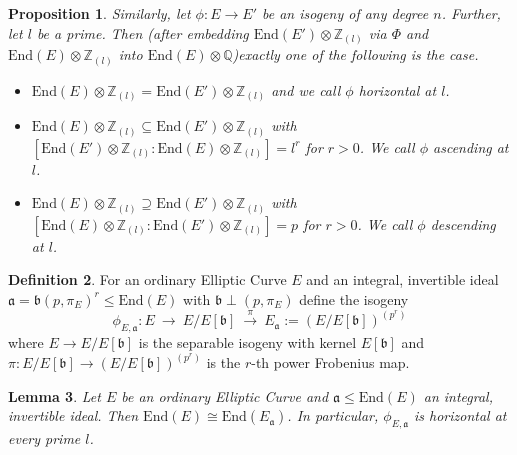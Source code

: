 \documentclass{scrartcl}
\newcommand{\Z}{\mathbb{Z}}
\newcommand{\Q}{\mathbb{Q}}
\newcommand{\End}{\mathrm{End}}
\renewcommand{\a}{\mathfrak{a}}
\renewcommand{\b}{\mathfrak{b}}
\newtheorem{prop}{Proposition}[section]
\newtheorem{lemma}[prop]{Lemma}
\theoremstyle{definition}
\newtheorem{definition}[prop]{Definition}
\begin{document}
\begin{prop}
    Similarly, let $\phi: E \to E'$ be an isogeny of any degree $n$.
    Further, let $l$ be a prime.
    Then (after embedding $\End(E') \otimes \Z_{(l)}$ via $\Phi$ and $\End(E) \otimes \Z_{(l)}$ into $\End(E) \otimes \Q$)exactly one of the following is the case.
    \begin{itemize}
        \item $\End(E) \otimes \Z_{(l)} = \End(E') \otimes \Z_{(l)}$ and we call $\phi$ \emph{horizontal at $l$}.
        \item $\End(E) \otimes \Z_{(l)} \subseteq \End(E') \otimes \Z_{(l)}$ with $[\End(E') \otimes \Z_{(l)} : \End(E) \otimes \Z_{(l)}] = l^r$ for $r > 0$. We call $\phi$ \emph{ascending at $l$}.
        \item $\End(E) \otimes \Z_{(l)} \supseteq \End(E') \otimes \Z_{(l)}$ with $[\End(E) \otimes \Z_{(l)} : \End(E') \otimes \Z_{(l)}] = p$ for $r > 0$. We call $\phi$ \emph{descending at $l$}.
    \end{itemize}
\end{prop}
\begin{definition}
    For an ordinary Elliptic Curve $E$ and an integral, invertible ideal $\a = \b(p, \pi_E)^r \leq \End(E)$ with $\b \perp (p, \pi_E)$ define the isogeny
    \begin{equation*}
        \phi_{E, \a}: E \ \longrightarrow \ E/E[\b] \ \overset{\pi}{\longrightarrow} \ E_\a := (E/E[\b])^{(p^r)}
    \end{equation*}
    where $E \to E/E[\b]$ is the separable isogeny with kernel $E[\b]$ and $\pi: E/E[\b] \to (E/E[\b])^{(p^r)}$ is the $r$-th power Frobenius map.
\end{definition}
\begin{lemma}
    Let $E$ be an ordinary Elliptic Curve and $\a \leq \End(E)$ an integral, invertible ideal.
    Then $\End(E) \cong \End(E_\a)$.
    In particular, $\phi_{E, \a}$ is horizontal at every prime $l$.
\end{lemma}
\end{document}
